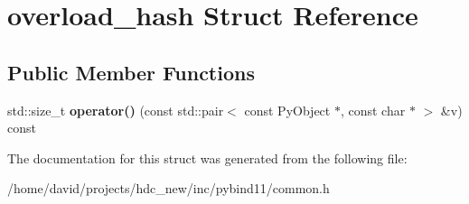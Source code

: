 \hypertarget{structoverload__hash}{}\section{overload\+\_\+hash Struct Reference}
\label{structoverload__hash}
\subsection*{Public Member Functions}
\begin{DoxyCompactItemize}
\item 
std\+::size\+\_\+t {\bfseries operator()} (const std\+::pair$<$ const Py\+Object $\ast$, const char $\ast$ $>$ \&v) const \hypertarget{structoverload__hash_a8f1e95483958bdeae15abe56851be81d}{}\label{structoverload__hash_a8f1e95483958bdeae15abe56851be81d}

\end{DoxyCompactItemize}


The documentation for this struct was generated from the following file\+:\begin{DoxyCompactItemize}
\item 
/home/david/projects/hdc\+\_\+new/inc/pybind11/common.\+h\end{DoxyCompactItemize}
